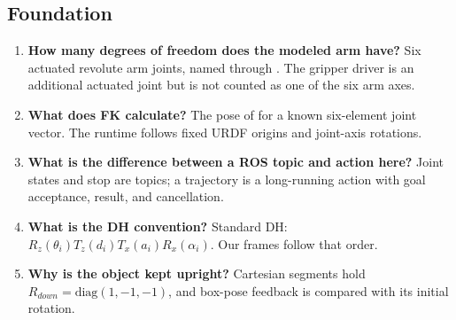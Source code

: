 \subsection{Foundation}
\begin{enumerate}
 \item \textbf{How many degrees of freedom does the modeled arm have?} Six
 actuated revolute arm joints, named  through
 . The gripper driver is an additional actuated joint but
 is not counted as one of the six arm axes.
 \item \textbf{What does FK calculate?} The pose of  for
 a known six-element joint vector. The runtime follows fixed URDF origins
 and joint-axis rotations.
 \item \textbf{What is the difference between a ROS topic and action here?}
 Joint states and stop are topics; a trajectory is a long-running action
 with goal acceptance, result, and cancellation.
 \item \textbf{What is the DH convention?} Standard DH:
 $R_z(\theta_i)T_z(d_i)T_x(a_i)R_x(\alpha_i)$. Our frames follow that order.
 \item \textbf{Why is the object kept upright?} Cartesian segments hold
 $R_{down}=\mathrm{diag}(1,-1,-1)$, and box-pose feedback is compared with
 its initial rotation.
\end{enumerate}

